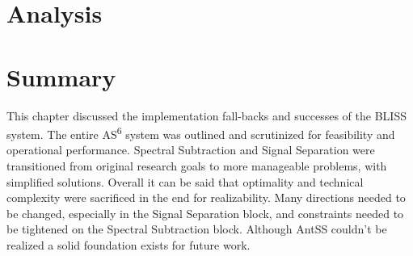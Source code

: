 \section{Analysis}

\section{Summary}
This chapter discussed the implementation fall-backs and successes of the BLISS system.  The entire AS\textsuperscript{6} system was outlined and scrutinized for feasibility and operational performance.  Spectral Subtraction and Signal Separation were transitioned from original research goals to more manageable problems, with simplified solutions.  Overall it can be said that optimality and technical complexity were sacrificed in the end for realizability.  Many directions needed to be changed, especially in the Signal Separation block, and constraints needed to be tightened on the Spectral Subtraction block.  Although AntSS couldn't be realized a solid foundation exists for future work.\\ 




